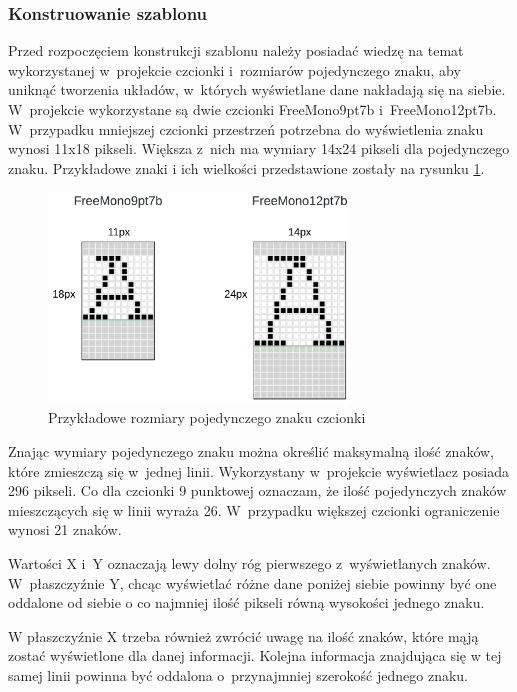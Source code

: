 \documentclass[a4paper,12pt, twoside]{article}
\begin{document}
    	\subsubsection{Konstruowanie szablonu}
    	Przed rozpoczęciem konstrukcji szablonu należy posiadać wiedzę na temat wykorzystanej w~projekcie czcionki i~rozmiarów pojedynczego znaku, aby uniknąć tworzenia układów, w~których wyświetlane dane nakładają się na siebie. W~projekcie wykorzystane są dwie czcionki FreeMono9pt7b i~FreeMono12pt7b. W~przypadku mniejszej czcionki przestrzeń potrzebna do wyświetlenia znaku wynosi 11x18 pikseli. Większa z~nich ma wymiary 14x24 pikseli dla pojedynczego znaku. Przykładowe znaki i ich wielkości przedstawione zostały na rysunku \ref{fig:font}.
    	\begin{figure}[H]
    	        \centering
    			\includegraphics[width=8cm]{images/rozmiarczcionek.png}
    			\caption{Przykładowe rozmiary pojedynczego znaku czcionki}
                \label{fig:font}
    	\end{figure}
    	
    	Znając wymiary pojedynczego znaku można określić maksymalną ilość znaków, które zmieszczą się w~jednej linii. Wykorzystany w~projekcie wyświetlacz posiada 296 pikseli. Co dla czcionki 9 punktowej oznaczam, że ilość pojedynczych znaków mieszczących się w linii wyraża 26. W~przypadku większej czcionki ograniczenie wynosi 21 znaków.
    	
    	Wartości X i~Y oznaczają lewy dolny róg pierwszego z~wyświetlanych znaków. W~płaszczyźnie Y, chcąc wyświetlać różne dane poniżej siebie powinny być one oddalone od siebie o co najmniej ilość pikseli równą wysokości jednego znaku.
    	
    	W płaszczyźnie X trzeba również zwrócić uwagę na ilość znaków, które mąją zostać wyświetlone dla danej informacji. Kolejna informacja znajdująca się w tej samej linii powinna być oddalona o~przynajmniej szerokość jednego znaku.
    	
\end{document}

